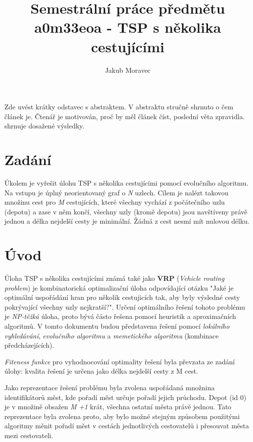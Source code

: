 \documentclass[journal]{IEEEtrancz}
\begin{document}
\title{Semestrální práce předmětu a0m33eoa - TSP s několika cestujícími}
\author{Jakub Moravec}

\maketitle

\begin{abstrakt}
Zde uvést krátky odstavec s abstraktem. V abstraktu stručně shrnuto o čem článek je.
Čtenář je motivován, proč by měl článek číst, poslední věta zpravidla.
shrnuje dosažené výsledky.
\end{abstrakt}

\IEEEpeerreviewmaketitle

\section{Zadání}
Úkolem je vyřešit úlohu TSP s několika cestujícími pomocí evolučního algoritmu. Na vstupu je úplný neorientovaný graf o \textit{N} uzlech. Cílem je nalézt takovou množinu cest pro \textit{M} cestujících, které všechny vychází z počátečního uzlu (depotu) a zase v něm končí, všechny uzly (kromě depotu) jsou navštíveny právě jednou a délka nejdelší cesty je minimální. Žádná z cest nesmí mít nulovou délku.

\section{Úvod}
Úloha TSP s několika cestujícími známá také jako \textbf{VRP} (\textit{Vehicle routing problem}) je kombinatorická optimalizační úloha odpovídající otázku "Jaké je optimální uspořádání hran pro několik cestujicích tak, aby byly výsledné cesty pokrývající všechny uzly nejkratší?". Určení optimálního řešení tohoto problému je \textit{NP-těžká} úloha, proto bývá částo řešena pomocí heuristik a aproximačních algoritmů. V tomto dokumentu budou představena řešení pomocí \textit{lokálního vyhledávání}, \textit{evolučního algoritmu} a \textit{memetického algoritmu} (kombinace předcházejících). 

\textit{Fiteness funkce} pro vyhodnocování optimality řešení byla převzata ze zadání úlohy: kvalita řešení je určena jako délka nejdelší cesty z M cest.

Jako reprezentace řešení problému byla zvolena uspořádaná množnina identifikátorů měst, kde pořadí měst určuje pořadí jejich průchodu. Depot (id 0) je v množině obsažen \textit{M +1} krát, všechna ostatní města právě jednou. Tato reprezentace byla zvolena proto, aby bylo možné stejným způsobem použitými algoritmy měnit pořadí měst v cestách jednotlivých cestovatelů i přesouvat města mezi cestovateli.  
\end{document}
